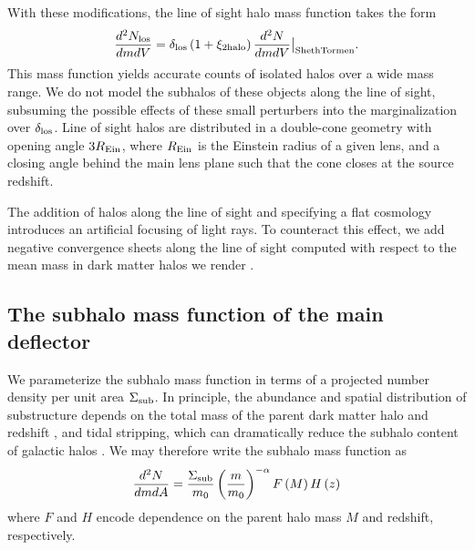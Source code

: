 With these modifications, the line of sight halo mass function takes the form
\begin{equation}
\label{eqn:losmfunc}
\frac{d^2N_{\rm{los}}}{dm  dV} = {\delta_{\rm{los}}} \left(1+ \xi_{\rm{2halo}} \right) \frac{d^2N}{dm  dV} \big \vert_{\rm{ShethTormen}}.
\end{equation}
This mass function yields accurate counts of isolated halos over a wide mass range. We do not model the subhalos of these objects along the line of sight, subsuming the possible effects of these small perturbers into the marginalization over $\delta_{\rm{los}}$. Line of sight halos are distributed in a double-cone geometry with opening angle $3 R_{\rm{Ein}}$, where $R_{\rm{Ein}}$ is the Einstein radius of a given lens, and a closing angle behind the main lens plane such that the cone closes at the source redshift. 

The addition of halos along the line of sight and specifying a flat cosmology introduces an artificial focusing of light rays. To counteract this effect, we add negative convergence sheets along the line of sight computed with respect to the mean mass in dark matter halos we render \cite[see][]{Birrer++17b}.

\subsection{The subhalo mass function of the main deflector}
\label{ssec:submfunc}
We parameterize the subhalo mass function in terms of a projected number density per unit area $\Sigma_{\rm{sub}}$. In principle, the abundance and spatial distribution of substructure depends on the total mass of the parent dark matter halo and redshift \cite{Gao++11,Han++16}, and tidal stripping, which can dramatically reduce the subhalo content of galactic halos \cite{DespVeg16,Han++16,GK++17,JiangvdB17,Richings++18}. We may therefore write the subhalo mass function as
\begin{equation}
\label{eqn:submfunc}
\frac{d^2N}{dmdA} = \frac{\Sigma_{\rm{sub}}}{m_0} \left(\frac{m}{m_0}\right)^{-\alpha} F\left(M\right) H\left(z\right)
\end{equation}
where $F$ and $H$ encode dependence on the parent halo mass $M$ and redshift, respectively.  

